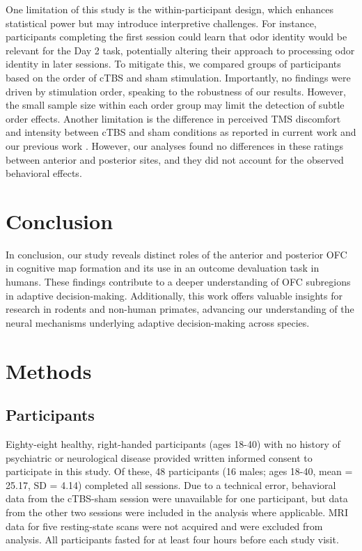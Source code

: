 \documentclass[lineno,sn-basic]{sn-jnl}%
\begin{document}
One limitation of this study is the within-participant design, which enhances statistical power but may introduce interpretive challenges. For instance, participants completing the first session could learn that odor identity would be relevant for the Day 2 task, potentially altering their approach to processing odor identity in later sessions. To mitigate this, we compared groups of participants based on the order of cTBS and sham stimulation. Importantly, no findings were driven by stimulation order, speaking to the robustness of our results. However, the small sample size within each order group may limit the detection of subtle order effects. Another limitation is the difference in perceived TMS discomfort and intensity between cTBS and sham conditions as reported in current work and our previous work \citep{liuyaoatt24}. However, our analyses found no differences in these ratings between anterior and posterior sites, and they did not account for the observed behavioral effects. 

\section{Conclusion}
\label{sec-conc}

In conclusion, our study reveals distinct roles of the anterior and posterior OFC in cognitive map formation and its use in an outcome devaluation task in humans. These findings contribute to a deeper understanding of OFC subregions in adaptive decision-making. Additionally, this work offers valuable insights for research in rodents and non-human primates, advancing our understanding of the neural mechanisms underlying adaptive decision-making across species.



\section{Methods}
\label{sec:method}
\subsection{Participants} 
\label{participants}

Eighty-eight healthy, right-handed participants (ages 18-40) with no history of psychiatric or neurological disease provided written informed consent to participate in this study. Of these, 48 participants (16 males; ages 18-40, mean = 25.17, SD = 4.14) completed all sessions. Due to a technical error, behavioral data from the cTBS-sham session were unavailable for one participant, but data from the other two sessions were included in the analysis where applicable. MRI data for five resting-state scans were not acquired and were excluded from analysis. All participants fasted for at least four hours before each study visit.
\end{document}
